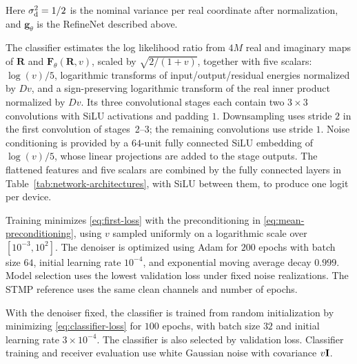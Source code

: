 Here $\sigma_{\rm d}^2=1/2$ is the nominal variance per real coordinate after
normalization, and $\mathbf g_\theta$ is the RefineNet described above.

The classifier estimates the log likelihood ratio from $4M$ real and
imaginary maps of $\mathbf R$ and $\mathbf F_\theta(\mathbf R,v)$,
scaled by $\sqrt{2/(1+v)}$, together with five scalars:
$\log(v)/5$, logarithmic transforms of input/output/residual energies
normalized by $Dv$, and a sign-preserving logarithmic transform of the
real inner product normalized by $Dv$.
Its three convolutional stages each contain two $3\times3$ convolutions
with SiLU activations and padding $1$. Downsampling uses stride $2$ in
the first convolution of stages~2--3; the remaining convolutions use
stride $1$.
Noise conditioning is provided by a $64$-unit fully connected SiLU
embedding of $\log(v)/5$, whose linear projections are added to the
stage outputs. The flattened features and five scalars are combined by
the fully connected layers in Table~\ref{tab:network-architectures},
with SiLU between them, to produce one logit per device.

Training minimizes \eqref{eq:first-loss} with the preconditioning in
\eqref{eq:mean-preconditioning}, using $v$ sampled uniformly on a
logarithmic scale over $[10^{-3},10^2]$.
The denoiser is optimized using Adam for $200$ epochs with batch size
$64$, initial learning rate $10^{-4}$, and exponential moving average
decay $0.999$. Model selection uses the lowest validation loss under
fixed noise realizations. The STMP reference uses the same clean
channels and number of epochs.

With the denoiser fixed, the classifier is trained from random
initialization by minimizing \eqref{eq:classifier-loss} for $100$ epochs,
with batch size $32$ and initial learning rate $3\times10^{-4}$.
The classifier is also selected by validation loss.
Classifier training and receiver evaluation use white Gaussian noise
with covariance $v\mathbf{I}$.

